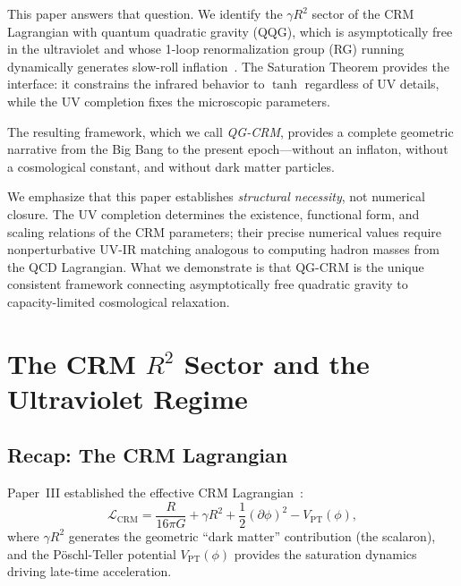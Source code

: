 \documentclass[aps,prd,twocolumn,superscriptaddress,nofootinbib]{revtex4-2}
\begin{document}
This paper answers that question. We identify the $\gamma R^2$ sector of the CRM Lagrangian with quantum quadratic gravity (QQG), which is asymptotically free in the ultraviolet and whose 1-loop renormalization group (RG) running dynamically generates slow-roll inflation~\cite{LiuQuintinAfshordi2026}. The Saturation Theorem provides the interface: it constrains the infrared behavior to $\tanh$ regardless of UV details, while the UV completion fixes the microscopic parameters.

The resulting framework, which we call \textit{QG-CRM}, provides a complete geometric narrative from the Big Bang to the present epoch---without an inflaton, without a cosmological constant, and without dark matter particles.

We emphasize that this paper establishes \textit{structural necessity}, not numerical closure. The UV completion determines the existence, functional form, and scaling relations of the CRM parameters; their precise numerical values require nonperturbative UV-IR matching analogous to computing hadron masses from the QCD Lagrangian. What we demonstrate is that QG-CRM is the unique consistent framework connecting asymptotically free quadratic gravity to capacity-limited cosmological relaxation.


\section{The CRM $R^2$ Sector and the Ultraviolet Regime}
\label{sec:r2sector}

\subsection{Recap: The CRM Lagrangian}

Paper~III established the effective CRM Lagrangian~\cite{Geiger2026c}:
\begin{equation}
\mathcal{L}_\mathrm{CRM} = \frac{R}{16\pi G} + \gamma R^2 + \frac{1}{2}(\partial\phi)^2 - V_\mathrm{PT}(\phi),
\label{eq:crm-lagrangian}
\end{equation}
where $\gamma R^2$ generates the geometric ``dark matter'' contribution (the scalaron), and the P\"oschl-Teller potential $V_\mathrm{PT}(\phi)$ provides the saturation dynamics driving late-time acceleration.
\end{document}
